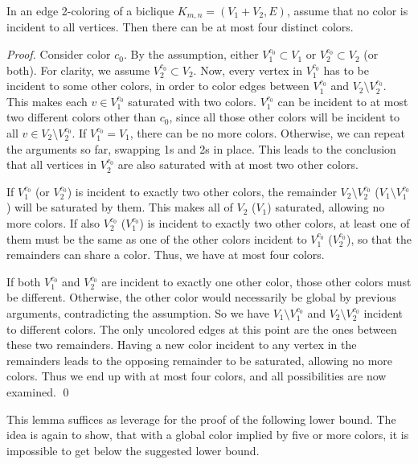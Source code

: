 \documentclass[runningheads, a4paper]{llncs}
\begin{document}
\begin{lemma}\label{lemma:biclique}
In an edge 2-coloring of a biclique $K_{m,n} = (V_1 + V_2, E)$, assume that no color is incident to all vertices. Then there can be at most four distinct colors.
\end{lemma}
\begin{proof}
Consider color $c_0$. By the assumption, either $V_1^{c_0} \subset V_1$ or $V_2^{c_0} \subset V_2$ (or both). For clarity, we assume $V_2^{c_0} \subset V_2$. Now, every vertex in $V_1^{c_0}$ has to be incident to some other colors, in order to color edges between $V_1^{c_0}$ and $V_2 \setminus V_2^{c_0}$. This makes each $v \in V_1^{c_0}$ saturated with two colors. $V_1^{c_0}$ can be incident to at most two different colors other than $c_0$, since all those other colors will be incident to all $v \in V_2 \setminus V_2^{c_0}$. If $V_1^{c_0} = V_1$, there can be no more colors. Otherwise, we can repeat the arguments so far, swapping 1s and 2s in place. This leads to the conclusion that all vertices in $V_2^{c_0}$ are also saturated with at most two other colors.

If $V_1^{c_0}$ (or $V_2^{c_0}$) is incident to exactly two other colors, the remainder $V_2 \setminus V_2^{c_0}$ ($V_1 \setminus V_1^{c_0}$) will be saturated by them. This makes all of $V_2$ ($V_1$) saturated, allowing no more colors. If also $V_2^{c_0}$ ($V_1^{c_0}$) is incident to exactly two other colors, at least one of them must be the same as one of the other colors incident to $V_1^{c_0}$ ($V_2^{c_0}$), so that the remainders can share a color. Thus, we have at most four colors.

If both $V_1^{c_0}$ and $V_2^{c_0}$ are incident to exactly one other color, those other colors must be different. Otherwise, the other color would necessarily be global by previous arguments, contradicting the assumption. So we have $V_1 \setminus V_1^{c_0}$ and $V_2 \setminus V_2^{c_0}$ incident to different colors. The only uncolored edges at this point are the ones between these two remainders. Having a new color incident to any vertex in the remainders leads to the opposing remainder to be saturated, allowing no more colors. Thus we end up with at most four colors, and all possibilities are now examined. \qed
\end{proof}

This lemma suffices as leverage for the proof of the following lower bound. The idea is again to show, that with a global color implied by five or more colors, it is impossible to get below the suggested lower bound.
\end{document}
